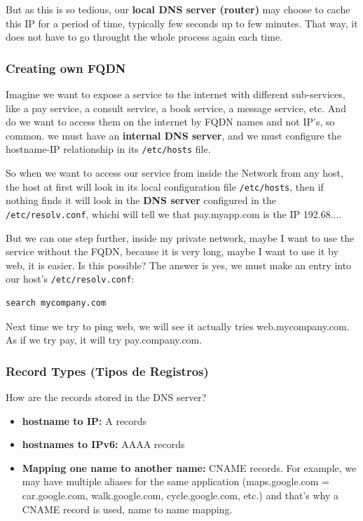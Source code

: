 \documentclass{article}
\newenvironment{codetemplate}[1][]{%
  \mybasecolorbox[#1]
  \itshape
}{%
  \endmybasecolorbox
}
\begin{document}
But as this is so tedious, our \textbf{local DNS server (router)} may choose to cache this IP for a period of time, typically few seconds up to few minutes. That way, it does not have to go throught the whole process again each time.

\subsubsection{Creating own FQDN}

Imagine we want to expose a service to the internet with different sub-services, like a pay service, a consult service, a book service, a message service, etc. And do we want to access them on the internet by FQDN names and not IP's, so common. we must have an \textbf{internal DNS server}, and we must configure the hostname-IP relationship in its \verb|/etc/hosts| file.

So when we want to access our service from inside the Network from any host, the host at first will look in its local configuration file \verb|/etc/hosts|, then if nothing finds it will look in the \textbf{DNS server} configured in the \verb|/etc/resolv.conf|, whichi will tell we that pay.myapp.com is the IP 192.68....

But we can one step further, inside my private network, maybe I want to use the service without the FQDN, because it is very long, maybe I want to use it by web, it is easier. Is this possible? The answer is yes, we must make an entry into our host's \verb|/etc/resolv.conf|:

\begin{codetemplate}{}
\begin{verbatim}
search mycompany.com
\end{verbatim}
\end{codetemplate}

Next time we try to ping web, we will see it actually tries web.mycompany.com. As if we try pay, it will try pay.company.com.

\subsubsection{Record Types (Tipos de Registros)}

How are the records stored in the DNS server?

\begin{itemize}
    \item \textbf{hostname to IP:} A records
    \item \textbf{hostnames to IPv6:} AAAA records
    \item \textbf{Mapping one name to another name:} CNAME records. For example, we may have multiple aliases for the same application (maps.google.com = car.google.com, walk.google.com, cycle.google.com, etc.) and that's why a CNAME record is used, name to name mapping.
\end{itemize}
\end{document}

